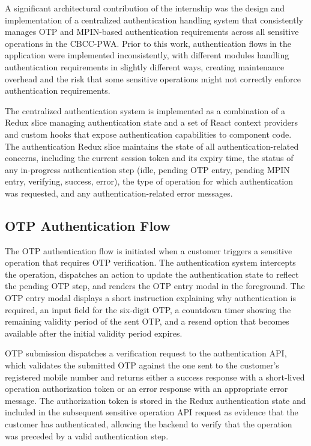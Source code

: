 A significant architectural contribution of the internship was the design and implementation of a centralized authentication handling system that consistently manages OTP and MPIN-based authentication requirements across all sensitive operations in the CBCC-PWA. Prior to this work, authentication flows in the application were implemented inconsistently, with different modules handling authentication requirements in slightly different ways, creating maintenance overhead and the risk that some sensitive operations might not correctly enforce authentication requirements.

The centralized authentication system is implemented as a combination of a Redux slice managing authentication state and a set of React context providers and custom hooks that expose authentication capabilities to component code. The authentication Redux slice maintains the state of all authentication-related concerns, including the current session token and its expiry time, the status of any in-progress authentication step (idle, pending OTP entry, pending MPIN entry, verifying, success, error), the type of operation for which authentication was requested, and any authentication-related error messages.

\subsection{OTP Authentication Flow}

The OTP authentication flow is initiated when a customer triggers a sensitive operation that requires OTP verification. The authentication system intercepts the operation, dispatches an action to update the authentication state to reflect the pending OTP step, and renders the OTP entry modal in the foreground. The OTP entry modal displays a short instruction explaining why authentication is required, an input field for the six-digit OTP, a countdown timer showing the remaining validity period of the sent OTP, and a resend option that becomes available after the initial validity period expires.

OTP submission dispatches a verification request to the authentication API, which validates the submitted OTP against the one sent to the customer's registered mobile number and returns either a success response with a short-lived operation authorization token or an error response with an appropriate error message. The authorization token is stored in the Redux authentication state and included in the subsequent sensitive operation API request as evidence that the customer has authenticated, allowing the backend to verify that the operation was preceded by a valid authentication step.

